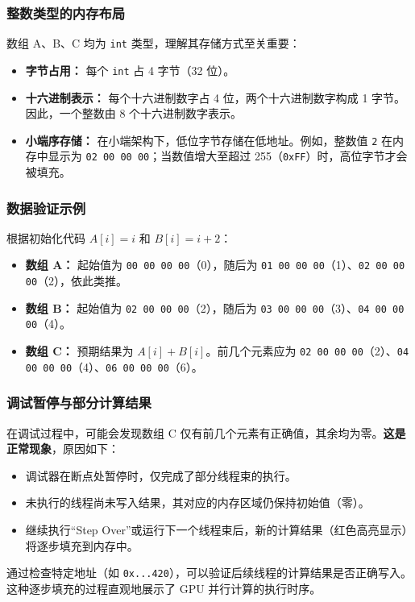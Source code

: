 \subsubsection{整数类型的内存布局}
数组 A、B、C 均为 \texttt{int} 类型，理解其存储方式至关重要：
\begin{itemize}
    \item \textbf{字节占用：} 每个 \texttt{int} 占 4 字节（32 位）。
    \item \textbf{十六进制表示：} 每个十六进制数字占 4 位，两个十六进制数字构成 1 字节。因此，一个整数由 8 个十六进制数字表示。
    \item \textbf{小端序存储：} 在小端架构下，低位字节存储在低地址。例如，整数值 \texttt{2} 在内存中显示为 \texttt{02 00 00 00}；当数值增大至超过 255（\texttt{0xFF}）时，高位字节才会被填充。
\end{itemize}

\subsubsection{数据验证示例}
根据初始化代码 $A[i]=i$ 和 $B[i]=i+2$：
\begin{itemize}
    \item \textbf{数组 A：} 起始值为 \texttt{00 00 00 00}（0），随后为 \texttt{01 00 00 00}（1）、\texttt{02 00 00 00}（2），依此类推。
    \item \textbf{数组 B：} 起始值为 \texttt{02 00 00 00}（2），随后为 \texttt{03 00 00 00}（3）、\texttt{04 00 00 00}（4）。
    \item \textbf{数组 C：} 预期结果为 $A[i]+B[i]$。前几个元素应为 \texttt{02 00 00 00}（2）、\texttt{04 00 00 00}（4）、\texttt{06 00 00 00}（6）。
\end{itemize}

\subsubsection{调试暂停与部分计算结果}
在调试过程中，可能会发现数组 C 仅有前几个元素有正确值，其余均为零。\textbf{这是正常现象}，原因如下：
\begin{itemize}
    \item 调试器在断点处暂停时，仅完成了部分线程束的执行。
    \item 未执行的线程尚未写入结果，其对应的内存区域仍保持初始值（零）。
    \item 继续执行“Step Over”或运行下一个线程束后，新的计算结果（红色高亮显示）将逐步填充到内存中。
\end{itemize}
通过检查特定地址（如 \texttt{0x...420}），可以验证后续线程的计算结果是否正确写入。这种逐步填充的过程直观地展示了 GPU 并行计算的执行时序。


